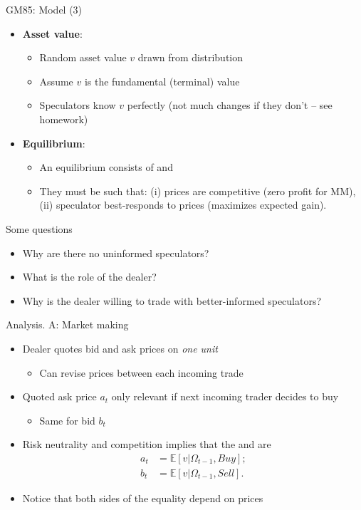\documentclass[english,10pt
,aspectratio=169
]{beamer}
\begin{document}
\begin{frame}{GM85: Model (3)}
\begin{itemize}
	\item \textbf{Asset value}:
	\begin{itemize}
		\item Random asset value $v$ drawn from distribution
		\item Assume $v$ is the fundamental (terminal) value
		\item Speculators know $v$ perfectly (not much changes if they don't -- see homework)
	\end{itemize}
	\item \textbf{Equilibrium}:
	\begin{itemize}
		\item An equilibrium consists of  and 
		\item They must be such that: (i) prices are competitive (zero profit for MM), (ii) speculator best-responds to prices (maximizes expected gain).
	\end{itemize}
\end{itemize}
\end{frame}


\begin{frame}{Some questions}
\begin{itemize}
	\item Why are there no uninformed speculators?
	\item What is the role of the dealer?
	\item Why is the dealer willing to trade with better-informed speculators?
\end{itemize}
\end{frame}


\begin{frame}{Analysis. A: Market making}
\begin{itemize}
	\item Dealer quotes bid and ask prices on \textit{one unit}
	\begin{itemize}
		\item Can revise prices between each incoming trade
	\end{itemize}
	\item Quoted ask price $a_t$ only relevant if next incoming trader decides to buy
	\begin{itemize}
		\item Same for bid $b_t$
	\end{itemize}
	\item Risk neutrality and competition implies that the  and  are
	\begin{align*}
		a_t & = \mathbb{E}[v|\Omega_{t-1}, Buy]; \\
		b_t &= \mathbb{E}[v|\Omega_{t-1},  Sell].
	\end{align*}
	\item Notice that both sides of the equality depend on prices
\end{itemize}
\end{frame}
\end{document}
